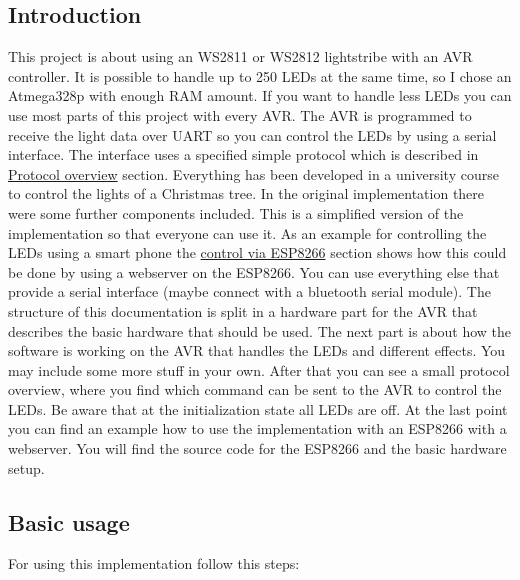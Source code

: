  \hypertarget{index_intro_sec}{}\subsection{Introduction}\label{index_intro_sec}
This project is about using an W\+S2811 or W\+S2812 lightstribe with an A\+V\+R controller. It is possible to handle up to 250 L\+E\+Ds at the same time, so I chose an Atmega328p with enough R\+A\+M amount. If you want to handle less L\+E\+Ds you can use most parts of this project with every A\+V\+R. The A\+V\+R is programmed to receive the light data over U\+A\+R\+T so you can control the L\+E\+Ds by using a serial interface. The interface uses a specified simple protocol which is described in \hyperlink{index_protocol_sec}{Protocol overview} section. Everything has been developed in a university course to control the lights of a Christmas tree. In the original implementation there were some further components included. This is a simplified version of the implementation so that everyone can use it. As an example for controlling the L\+E\+Ds using a smart phone the \hyperlink{index_esp_sec}{control via E\+S\+P8266} section shows how this could be done by using a webserver on the E\+S\+P8266. You can use everything else that provide a serial interface (maybe connect with a bluetooth serial module). The structure of this documentation is split in a hardware part for the A\+V\+R that describes the basic hardware that should be used. The next part is about how the software is working on the A\+V\+R that handles the L\+E\+Ds and different effects. You may include some more stuff in your own. After that you can see a small protocol overview, where you find which command can be sent to the A\+V\+R to control the L\+E\+Ds. Be aware that at the initialization state all L\+E\+Ds are off. At the last point you can find an example how to use the implementation with an E\+S\+P8266 with a webserver. You will find the source code for the E\+S\+P8266 and the basic hardware setup.\hypertarget{index_usage_sec}{}\subsection{Basic usage}\label{index_usage_sec}
For using this implementation follow this steps\+: 
